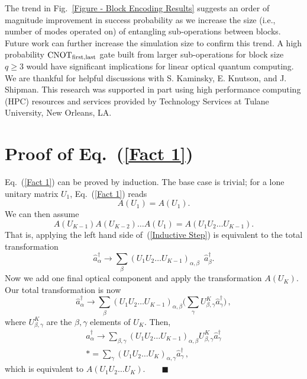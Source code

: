 \documentclass[aps,pra,twocolumn,superscriptaddress,floatfix,10pt]{revtex4}
\begin{document}
 The trend in Fig.~\ref{Figure - Block Encoding Results} suggests an order of magnitude improvement in success probability as we increase the size (i.e., number of modes operated on) of entangling sub-operations between blocks. Future work can further increase the simulation size to confirm this trend. A high probability $\mbox{CNOT}_{\rm first,last}$ gate built from larger sub-operations for block size $q \ge 3$ would have significant implications for linear optical quantum computing.
\acknowledgments
We are thankful for helpful discussions with S. Kaminsky, E. Knutson, and J. Shipman. This research was supported in part using high performance computing (HPC) resources and services provided by Technology Services at Tulane University, New Orleans, LA.
\appendix
\section{Proof of Eq.~(\ref{Fact 1})}
\label{Proof of Fact 1}
Eq.~(\ref{Fact 1}) can be proved by induction. The base case is trivial; for a lone unitary matrix $U_1$, Eq.~(\ref{Fact 1}) reads
\begin{equation}
	A(U_1) = A(U_1).
\end{equation}
We can then assume
\begin{equation}
\label{Inductive Step}
	A(U_{K-1}) A(U_{K-2}) \dots A(U_1) = A(U_1 U_2 \dots U_{K-1}).
\end{equation}
That is, applying the left hand side of~(\ref{Inductive Step}) is equivalent to the total transformation
\begin{equation}
	\hat{a}^\dagger_\alpha \rightarrow \sum_\beta (U_1 U_2 \dots U_{K-1})_{\alpha,\beta} \enspace \hat{a}^\dagger_\beta.
\end{equation}
Now we add one final optical component and apply the transformation $A(U_K)$. Our total transformation is now
\begin{equation}
	\hat{a}^\dagger_\alpha \rightarrow \sum_\beta (U_1 U_2 \dots U_{K-1})_{\alpha,\beta} \Big(\sum_\gamma U_{\beta,\gamma}^K \hat{a}^\dagger_\gamma \Big)\,,
\end{equation}
where $U_{\beta,\gamma}^K$ are the $\beta,\gamma$ elements of $U_K$. Then,
\begin{eqnarray}
\hat{a}^\dagger_\alpha \rightarrow \sum_{\beta,\gamma} (U_1 U_2 \dots U_{K-1})_{\alpha,\beta} U^K_{\beta,\gamma} \hat{a}^\dagger_\gamma
\\*
= \sum_\gamma (U_1 U_2 \dots U_K)_{\alpha,\gamma} \hat{a}^\dagger_\gamma \,, \quad \quad
\end{eqnarray}
which is equivalent to $A(U_1 U_2 \dots U_K). \quad \quad\blacksquare $
\end{document}

